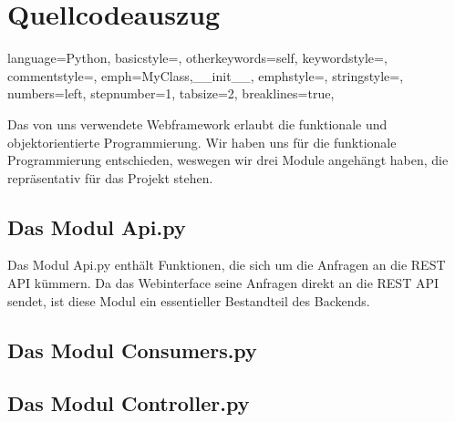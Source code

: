 \section{Quellcodeauszug}


\lstset
{
    language=Python,
    basicstyle=\footnotesize,
    otherkeywords={self},             %
    keywordstyle=\color{deepblue},
    commentstyle=\color{string-color},
    emph={MyClass,__init__},          %
    emphstyle=\color{deepred},    %
    stringstyle=\color{deepgreen},
    numbers=left,
    stepnumber=1,
    tabsize=2,
    breaklines=true,
}

Das von uns verwendete Webframework erlaubt die funktionale und objektorientierte Programmierung. Wir haben uns für die funktionale Programmierung
entschieden, weswegen wir drei Module angehängt haben, die repräsentativ für das Projekt stehen.

\subsection{Das Modul Api.py}
Das Modul Api.py enthält Funktionen, die sich um die Anfragen an die REST API kümmern. 
Da das Webinterface seine Anfragen direkt an die REST API sendet, ist diese Modul ein essentieller
Bestandteil des Backends.


\subsection{Das Modul Consumers.py}



\subsection{Das Modul Controller.py}


